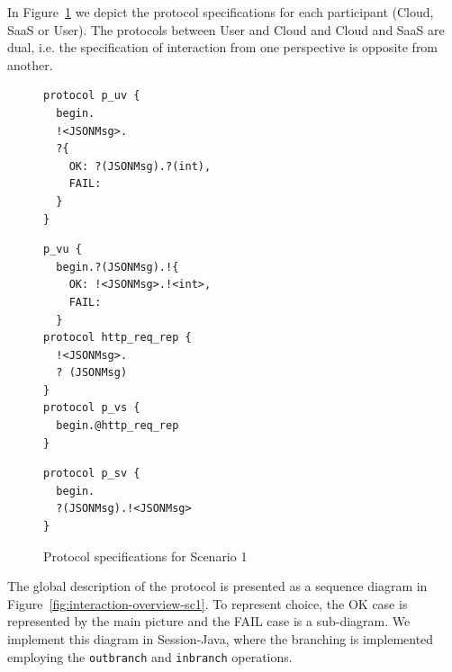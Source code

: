 \documentclass{llncs}
\begin{document}
In Figure~\ref{fig:protocols-sc1} we depict the protocol specifications for each participant (Cloud, SaaS or User).
The protocols between User and Cloud and Cloud and SaaS are dual, i.e. the specification of interaction from one perspective is opposite from another.
%
{
\lstset{
  framerule=0pt,
  numbers=none,
  basicstyle=\ttfamily\scriptsize,
}
\renewcommand\lstlistingname{Protocol}
\begin{figure}

\begin{minipage}[t]{0.30\textwidth}
\begin{lstlisting}[caption=User]
protocol p_uv { 
  begin.
  !<JSONMsg>. 
  ?{
    OK: ?(JSONMsg).?(int),
    FAIL: 
  }
}
\end{lstlisting}
\end{minipage}
\begin{minipage}[t]{0.35\textwidth}
\begin{lstlisting}[caption=Cloud]
p_vu { 
  begin.?(JSONMsg).!{
    OK: !<JSONMsg>.!<int>,
    FAIL: 
  }
protocol http_req_rep {
  !<JSONMsg>.
  ? (JSONMsg)
}
protocol p_vs { 
  begin.@http_req_rep 
}
\end{lstlisting}
\end{minipage}
\begin{minipage}[t]{0.30\textwidth}
\begin{lstlisting}[caption=SaaS]
protocol p_sv { 
  begin.
  ?(JSONMsg).!<JSONMsg> 
}
\end{lstlisting}
\end{minipage}
\caption{Protocol specifications for Scenario 1}\label{fig:protocols-sc1} 
\end{figure}

}


The global description of the protocol is presented as a sequence diagram in Figure~\ref{fig:interaction-overview-sc1}. %
To represent choice, the OK case is represented by the main picture and the FAIL case is a sub-diagram.
We implement this diagram in Session-Java, where the branching is implemented employing the \texttt{outbranch} and \texttt{inbranch} operations.
\end{document}
